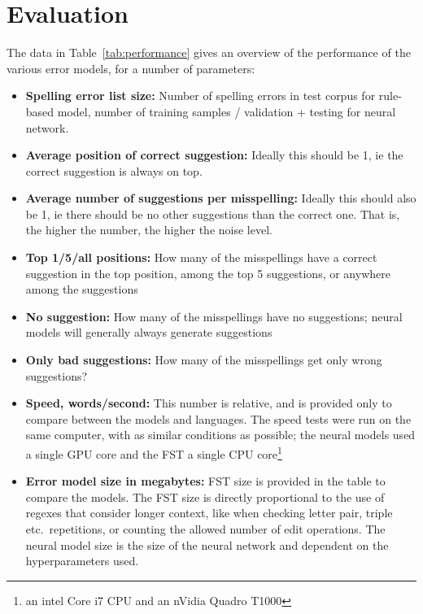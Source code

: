 \documentclass{flammie}
\begin{document}
\section{Evaluation}


The data in Table~\ref{tab:performance} gives an overview of the performance of
the various error models, for a number of parameters:

\begin{itemize}
\item \textbf{Spelling error list size:} Number of spelling errors in test
    corpus for rule-based model, number of training samples / validation +
        testing for neural network.
\item \textbf{Average position of correct suggestion:} Ideally this should be 1,
    ie the correct suggestion is always on top.
\item \textbf{Average number of suggestions per misspelling:} Ideally this
    should also be 1, ie there should be no other suggestions than the correct
        one. That is, the higher the number, the higher the noise level.
\item \textbf{Top 1/5/all positions:} How many of the misspellings have a
    correct suggestion in the top position, among the top 5 suggestions, or
        anywhere among the suggestions
\item \textbf{No suggestion:} How many of the misspellings have no suggestions;
    neural models will generally always generate suggestions
\item \textbf{Only bad suggestions:} How many of the misspellings get only wrong
    suggestions?
\item \textbf{Speed, words/second:} This number is relative, and is provided
    only to compare between the models and languages. The speed tests were run
        on the same computer, with as similar conditions as possible; the neural
        models used a single GPU core and the FST a single CPU core\footnote{an
        intel Core i7 CPU and an nVidia Quadro T1000}
\item \textbf{Error model size in megabytes:} FST size is provided in the table
    to compare the models. The FST size is directly proportional to the use of
        regexes that consider longer context, like when checking letter pair,
        triple etc.\ repetitions, or counting the allowed number of edit
        operations. The neural model size is the size of the neural network and
        dependent on the hyperparameters used.
\end{itemize}
\end{document}
